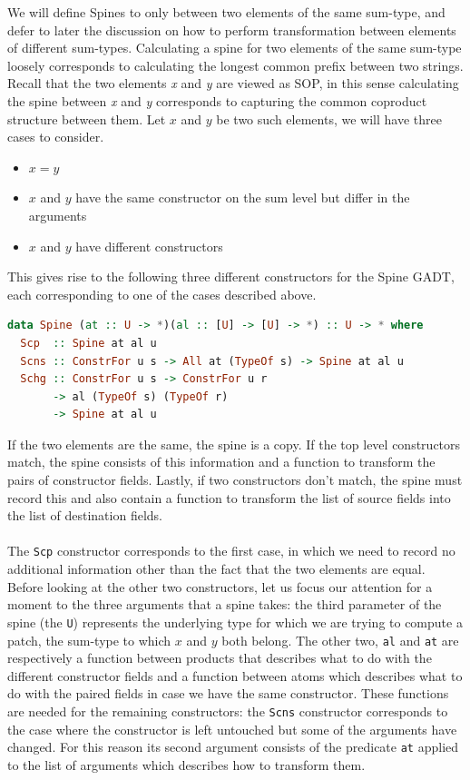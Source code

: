 \documentclass[11pt]{article}
\begin{document}
We will define Spines to only between two elements of the same sum-type, and defer to later the discussion on how
to perform transformation between elements of different sum-types. Calculating a spine for two elements of the same sum-type 
loosely corresponds to calculating the longest common prefix between two strings. Recall that the two 
elements \emph{x} and \emph{y} are viewed as SOP, in this sense calculating the
spine between \emph{x} and \emph{y} corresponds to capturing the common
coproduct structure between them. Let $x$ and $y$ be two such elements, we will have three cases to
consider. 
\begin{itemize}
  \item $x = y$
  \item $x$ and $y$ have the same constructor on the sum level but differ in the 
  arguments
  \item $x$ and $y$ have different constructors
\end{itemize}

This gives rise
to the following three different constructors for the Spine GADT, each
corresponding to one of the cases described above.

\begin{lstlisting}[language=haskell]
data Spine (at :: U -> *)(al :: [U] -> [U] -> *) :: U -> * where
  Scp  :: Spine at al u
  Scns :: ConstrFor u s -> All at (TypeOf s) -> Spine at al u
  Schg :: ConstrFor u s -> ConstrFor u r
       -> al (TypeOf s) (TypeOf r)
       -> Spine at al u
\end{lstlisting}

If the two
elements are the same, the spine is a copy. If the top level
constructors match, the spine consists of this information and a function to
transform the pairs of constructor fields. Lastly, if two constructors
don't match, the spine must record this and also contain a function to
transform the list of source fields into the list of destination fields.
\\\\
The \texttt{Scp} constructor corresponds to the first case, in which we need
to record no additional information other than the fact that the two
elements are equal. 
Before looking at the other two constructors, let us focus our attention for a moment to the three arguments that a spine takes:
the third parameter of the spine (the \texttt{U}) represents the
underlying type for which we are trying to compute a patch, the sum-type to which $x$ and $y$ both belong.
The other two, \texttt{al} and \texttt{at} are respectively a
function between products that describes what to do with the different
constructor fields and a function between atoms which describes what to
do with the paired fields in case we have the same constructor.
These functions are needed for the remaining constructors: the \texttt{Scns} constructor corresponds to the 
case where the constructor is left untouched but some of the arguments have changed.
For this reason its second argument consists of the predicate \texttt{at} applied to the list of arguments which describes
how to transform them. 
\end{document}
